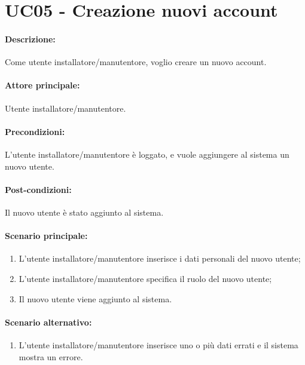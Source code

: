 \section{UC05 - Creazione nuovi account}

\paragraph{Descrizione:}
Come utente installatore/manutentore, voglio creare un nuovo account.

\paragraph{Attore principale:}
Utente installatore/manutentore.

\paragraph{Precondizioni:}
L'utente installatore/manutentore è loggato, e vuole aggiungere al sistema un nuovo utente.

\paragraph{Post-condizioni:}
Il nuovo utente è stato aggiunto al sistema.

\paragraph{Scenario principale:}
\begin{enumerate}
    \item L'utente installatore/manutentore inserisce i dati personali del nuovo utente; %
    \item L'utente installatore/manutentore specifica il ruolo del nuovo utente;
    \item Il nuovo utente viene aggiunto al sistema.
\end{enumerate}

\paragraph{Scenario alternativo:}
\begin{enumerate}
    \item L'utente installatore/manutentore inserisce uno o più dati errati e il sistema mostra un errore.
\end{enumerate}
